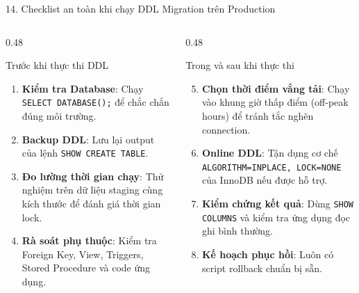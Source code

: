 \documentclass[aspectratio=169,11pt]{beamer}
\begin{document}
\begin{frame}{14. Checklist an toàn khi chạy DDL Migration trên Production}
\begin{columns}[t]
  \begin{column}{0.48\textwidth}
    \begin{block}{Trước khi thực thi DDL}
      \begin{enumerate}\setlength{\itemsep}{2pt}
        \item \textbf{Kiểm tra Database}: Chạy \texttt{SELECT DATABASE();} để chắc chắn đúng môi trường.
        \item \textbf{Backup DDL}: Lưu lại output của lệnh \texttt{SHOW CREATE TABLE}.
        \item \textbf{Đo lường thời gian chạy}: Thử nghiệm trên dữ liệu staging cùng kích thước để đánh giá thời gian lock.
        \item \textbf{Rà soát phụ thuộc}: Kiểm tra Foreign Key, View, Triggers, Stored Procedure và code ứng dụng.
      \end{enumerate}
    \end{block}
  \end{column}
  \begin{column}{0.48\textwidth}
    \begin{block}{Trong và sau khi thực thi}
      \begin{enumerate}\setcounter{enumi}{4}\setlength{\itemsep}{2pt}
        \item \textbf{Chọn thời điểm vắng tải}: Chạy vào khung giờ thấp điểm (off-peak hours) để tránh tắc nghẽn connection.
        \item \textbf{Online DDL}: Tận dụng cơ chế \texttt{ALGORITHM=INPLACE, LOCK=NONE} của InnoDB nếu được hỗ trợ.
        \item \textbf{Kiểm chứng kết quả}: Dùng \texttt{SHOW COLUMNS} và kiểm tra ứng dụng đọc ghi bình thường.
        \item \textbf{Kế hoạch phục hồi}: Luôn có script rollback chuẩn bị sẵn.
      \end{enumerate}
    \end{block}
  \end{column}
\end{columns}
\end{frame}
\end{document}
